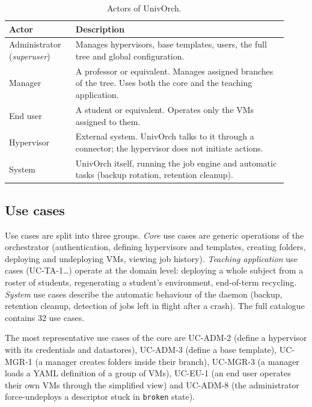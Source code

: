\begin{table}[ht]
  \centering
  \small
  \begin{tabular}{p{0.22\linewidth} p{0.70\linewidth}}
    \toprule
    \textbf{Actor} & \textbf{Description} \\
    \midrule
    Administrator (\emph{superuser}) &
    Manages hypervisors, base templates, users, the full tree and
    global configuration. \\
    Manager &
    A professor or equivalent. Manages assigned branches of the
    tree. Uses both the core and the teaching application. \\
    End user &
    A student or equivalent. Operates only the VMs assigned to them. \\
    Hypervisor &
    External system. UnivOrch talks to it through a connector;
    the hypervisor does not initiate actions. \\
    System &
    UnivOrch itself, running the job engine and automatic tasks
    (backup rotation, retention cleanup). \\
    \bottomrule
  \end{tabular}
  \caption{Actors of UnivOrch.}
  \label{tab:actors}
\end{table}

\subsection{Use cases}

Use cases are split into three groups. \emph{Core} use cases are
generic operations of the orchestrator (authentication, defining
hypervisors and templates, creating folders, deploying and
undeploying VMs, viewing job history). \emph{Teaching application}
use cases (UC-TA-1\dots) operate at the domain level: deploying a
whole subject from a roster of students, regenerating a student's
environment, end-of-term recycling. \emph{System} use cases describe
the automatic behaviour of the daemon (backup, retention cleanup,
detection of jobs left in flight after a crash). The full catalogue
contains 32 use cases.

The most representative use cases of the core are UC-ADM-2 (define a
hypervisor with its credentials and datastores), UC-ADM-3 (define a
base template), UC-MGR-1 (a manager creates folders inside their
branch), UC-MGR-3 (a manager loads a YAML definition of a group of
VMs), UC-EU-1 (an end user operates their own VMs through the
simplified view) and UC-ADM-8 (the administrator force-undeploys a
descriptor stuck in \texttt{broken} state).

